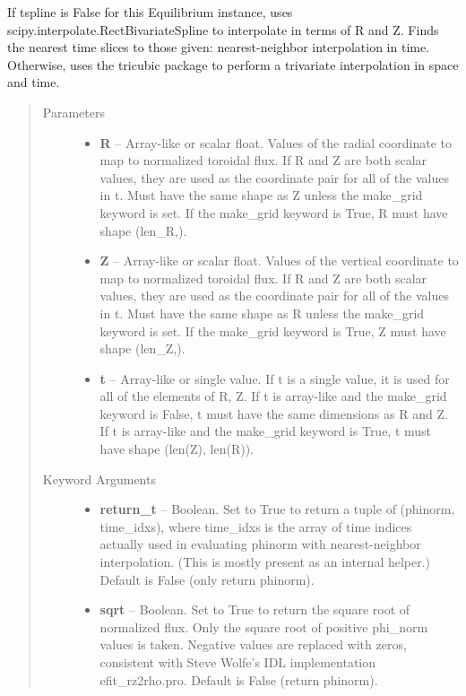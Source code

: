 \documentclass[letterpaper,10pt,english]{sphinxmanual}
\begin{document}
\begin{fulllineitems}
\begin{fulllineitems}
If tspline is False for this Equilibrium instance, uses
scipy.interpolate.RectBivariateSpline to interpolate in terms of R and
Z. Finds the nearest time slices to those given: nearest-neighbor
interpolation in time. Otherwise, uses the tricubic package to perform
a trivariate interpolation in space and time.
\begin{quote}\begin{description}
\item[{Parameters }] \leavevmode\begin{itemize}
\item {} 
\textbf{R} --
Array-like or scalar float. Values of the radial coordinate to
map to normalized toroidal flux. If R and Z are both scalar
values, they are used as the coordinate pair for all of the
values in t. Must have the same shape as Z unless the make\_grid
keyword is set. If the make\_grid keyword is True, R must have
shape (len\_R,).

\item {} 
\textbf{Z} --
Array-like or scalar float. Values of the vertical coordinate to
map to normalized toroidal flux. If R and Z are both scalar
values, they are used as the coordinate pair for all of the
values in t. Must have the same shape as R unless the make\_grid
keyword is set. If the make\_grid keyword is True, Z must have
shape (len\_Z,).

\item {} 
\textbf{t} --
Array-like or single value. If t is a single value, it is used
for all of the elements of R, Z. If t is array-like and the
make\_grid keyword is False, t must have the same dimensions as
R and Z. If t is array-like and the make\_grid keyword is True,
t must have shape (len(Z), len(R)).

\end{itemize}

\item[{Keyword Arguments}] \leavevmode\begin{itemize}
\item {} 
\textbf{return\_t} --
Boolean. Set to True to return a tuple of (phinorm,
time\_idxs), where time\_idxs is the array of time indices
actually used in evaluating phinorm with nearest-neighbor
interpolation. (This is mostly present as an internal helper.)
Default is False (only return phinorm).

\item {} 
\textbf{sqrt} --
Boolean. Set to True to return the square root of normalized
flux. Only the square root of positive phi\_norm values is taken.
Negative values are replaced with zeros, consistent with Steve
Wolfe's IDL implementation efit\_rz2rho.pro. Default is False
(return phinorm).


\end{itemize}
\end{description}
\end{quote}
\end{fulllineitems}
\end{fulllineitems}
\end{document}
